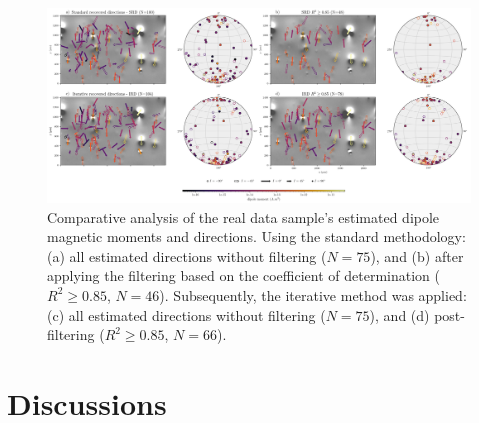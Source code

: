 \begin{figure}[tb!]
  \centering
  \includegraphics[width=1\linewidth]{paper/figures/real-data-stereograms.png}
  \caption{
Comparative analysis of the real data sample's estimated dipole magnetic moments and directions. Using the standard methodology: (a) all estimated directions without filtering ($N = 75$), and (b) after applying the filtering based on the coefficient of determination ($R^2 \geq 0.85$, $N = 46$). Subsequently, the iterative method was applied: (c) all estimated directions without filtering ($N = 75$), and (d) post-filtering ($R^2 \geq 0.85$, $N = 66$).
}
  \label{real-data-stereograms}
\end{figure}
\section{Discussions}








